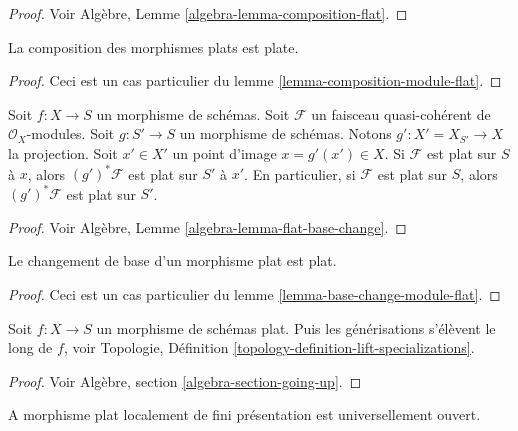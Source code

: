 \begin{proof}
Voir Algèbre, Lemme \ref{algebra-lemma-composition-flat}.
\end{proof}

\begin{lemma}
\label{lemma-composition-flat}
La composition des morphismes plats est plate.
\end{lemma}

\begin{proof}
Ceci est un cas particulier du lemme \ref{lemma-composition-module-flat}.
\end{proof}

\begin{lemma}
\label{lemma-base-change-module-flat}
Soit $f : X \to S$ un morphisme de schémas. Soit
$\mathcal{F}$ un faisceau quasi-cohérent de $\mathcal{O}_X$-modules. Soit
$g : S' \to S$ un morphisme de schémas. Notons
$g' : X' = X_{S'} \to X$ la projection. Soit $x' \in X'$ un
point d'image $x = g'(x') \in X$. Si $\mathcal{F}$ est plat sur
$S$ à $x$, alors $(g')^*\mathcal{F}$ est
plat sur $S'$ à $x'$. En particulier,
si $\mathcal{F}$ est plat sur $S$, alors
$(g')^*\mathcal{F}$ est plat sur $S'$.
\end{lemma}

\begin{proof}
Voir Algèbre, Lemme \ref{algebra-lemma-flat-base-change}.
\end{proof}

\begin{lemma}
\label{lemma-base-change-flat}
Le changement de base d'un morphisme plat est plat.
\end{lemma}

\begin{proof}
Ceci est un cas particulier du lemme \ref{lemma-base-change-module-flat}.
\end{proof}

\begin{lemma}
\label{lemma-generalizations-lift-flat}
Soit $f : X \to S$ un morphisme de schémas plat.
Puis les générisations s'élèvent le
long de $f$, voir Topologie, Définition \ref{topology-definition-lift-specializations}.
\end{lemma}

\begin{proof}
Voir Algèbre, section \ref{algebra-section-going-up}.
\end{proof}

\begin{lemma}
\label{lemma-fppf-open}
A morphisme plat localement de fini présentation est universellement ouvert.
\end{lemma}

